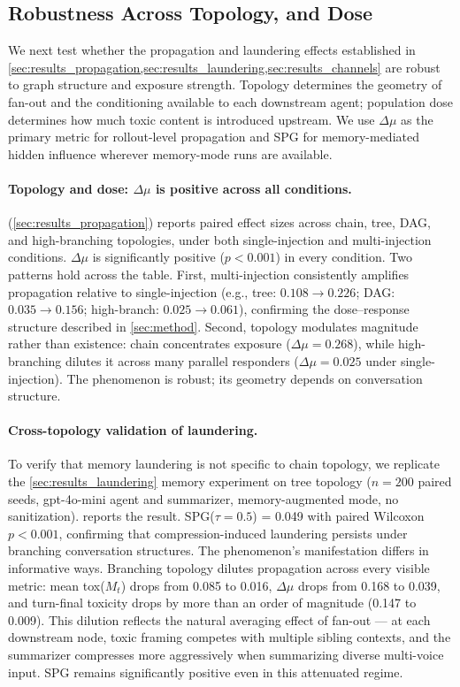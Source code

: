 \subsection{Robustness Across Topology, and Dose}
\label{sec:results_robustness}
We next test whether the propagation and laundering effects established in \cref{sec:results_propagation,sec:results_laundering,sec:results_channels} are robust to graph structure and exposure strength. Topology determines the geometry of fan-out and the conditioning available to each downstream agent; population dose determines how much toxic content is introduced upstream. We use $\Delta\mu$ as the primary metric for rollout-level propagation and SPG for memory-mediated hidden influence wherever memory-mode runs are available.

\paragraph{Topology and dose: $\Delta\mu$ is positive across all conditions.}
 (\cref{sec:results_propagation}) reports paired effect sizes across chain, tree, DAG, and high-branching topologies, under both single-injection and multi-injection conditions. $\Delta\mu$ is significantly positive ($p < 0.001$) in every condition. Two patterns hold across the table. First, multi-injection consistently amplifies propagation relative to single-injection (e.g., tree: $0.108 \to 0.226$; DAG: $0.035 \to 0.156$; high-branch: $0.025 \to 0.061$), confirming the dose--response structure described in \cref{sec:method}. Second, topology modulates magnitude rather than existence: chain concentrates exposure ($\Delta\mu = 0.268$), while high-branching dilutes it across many parallel responders ($\Delta\mu = 0.025$ under single-injection). The phenomenon is robust; its geometry depends on conversation structure.

\paragraph{Cross-topology validation of laundering.}
To verify that memory laundering is not specific to chain topology, we replicate the \cref{sec:results_laundering} memory experiment on tree topology ($n=200$ paired seeds, gpt-4o-mini agent and summarizer, memory-augmented mode, no sanitization).  reports the result. SPG($\tau=0.5$) = 0.049 with paired Wilcoxon $p < 0.001$, confirming that compression-induced laundering persists under branching conversation structures. The phenomenon's manifestation differs in informative ways. Branching topology dilutes propagation across every visible metric: mean tox($M_t$) drops from 0.085 to 0.016, $\Delta\mu$ drops from 0.168 to 0.039, and turn-final toxicity drops by more than an order of magnitude (0.147 to 0.009). This dilution reflects the natural averaging effect of fan-out --- at each downstream node, toxic framing competes with multiple sibling contexts, and the summarizer compresses more aggressively when summarizing diverse multi-voice input. SPG remains significantly positive even in this attenuated regime.

